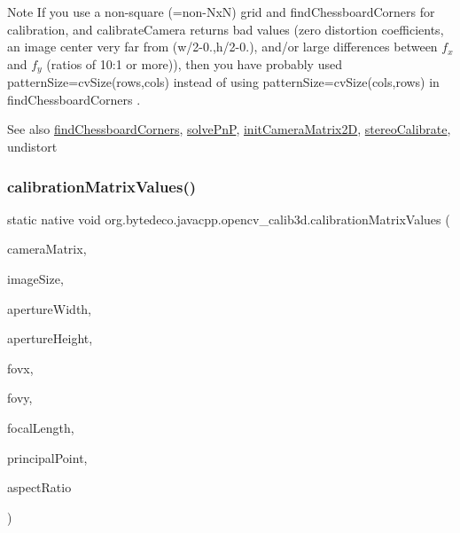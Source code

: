 \begin{DoxyNote}{Note}
If you use a non-\/square (=non-\/\+NxN) grid and find\+Chessboard\+Corners for calibration, and calibrate\+Camera returns bad values (zero distortion coefficients, an image center very far from (w/2-\/0.,h/2-\/0.), and/or large differences between $f_x$ and $f_y$ (ratios of 10\+:1 or more)), then you have probably used pattern\+Size=cv\+Size(rows,cols) instead of using pattern\+Size=cv\+Size(cols,rows) in find\+Chessboard\+Corners . 
\end{DoxyNote}
\begin{DoxySeeAlso}{See also}
\hyperlink{group__calib3d_ga8736b25349ec9178b46c38128bd9d95a}{find\+Chessboard\+Corners}, \hyperlink{group__calib3d_ga4ed4dcff68153a9ec5eb087c0ee29913}{solve\+PnP}, \hyperlink{group__calib3d_ga783c80e734c8368c9db31e3ad820f7fa}{init\+Camera\+Matrix2D}, \hyperlink{group__calib3d_gab585e0688b9d7592dfe294c5179bdcae}{stereo\+Calibrate}, undistort 
\end{DoxySeeAlso}
\mbox{\label{group__calib3d_ga35bea5b10b8dfd23238f72e9a2e2ac27}} 
\subsubsection{\texorpdfstring{calibration\+Matrix\+Values()}{calibrationMatrixValues()}}
{\footnotesize\ttfamily static native void org.\+bytedeco.\+javacpp.\+opencv\+\_\+calib3d.\+calibration\+Matrix\+Values (\begin{DoxyParamCaption}\item[{@By\+Val Mat}]{camera\+Matrix,  }\item[{@By\+Val Size}]{image\+Size,  }\item[{double}]{aperture\+Width,  }\item[{double}]{aperture\+Height,  }\item[{@By\+Ref Double\+Pointer}]{fovx,  }\item[{@By\+Ref Double\+Pointer}]{fovy,  }\item[{@By\+Ref Double\+Pointer}]{focal\+Length,  }\item[{@By\+Ref Point2d}]{principal\+Point,  }\item[{@By\+Ref Double\+Pointer}]{aspect\+Ratio }\end{DoxyParamCaption})\hspace{0.3cm}{\ttfamily [static]}}



